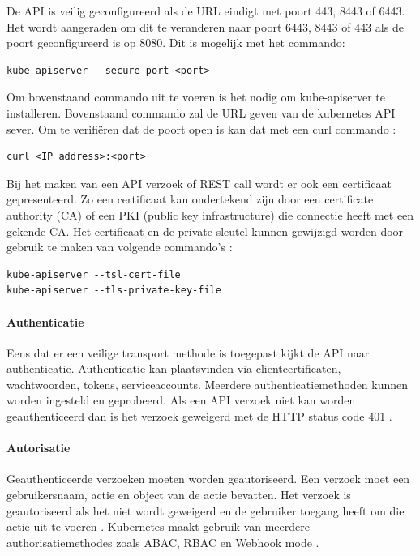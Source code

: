 De API is veilig geconfigureerd als de URL eindigt met poort 443, 8443 of 6443. Het wordt aangeraden om dit te veranderen naar poort 6443, 8443 of 443 als de poort geconfigureerd is op 8080. Dit is mogelijk met het commando:
\begin{lstlisting}[language=tex, caption={Veranderen poort Kubernetes API}]
kube-apiserver --secure-port <port>
\end{lstlisting}

Om bovenstaand commando uit te voeren is het nodig om kube-apiserver te installeren. 
Bovenstaand commando zal de URL geven van de kubernetes API sever. Om te verifiëren dat de poort open is kan dat met een curl commando \autocite{Rice2018}:
\begin{lstlisting}[language=tex, caption={verifiëren poort open}]
curl <IP address>:<port>
\end{lstlisting}

Bij het maken van een API verzoek of REST call wordt er ook een certificaat gepresenteerd. Zo een certificaat kan ondertekend zijn door een certificate authority (CA) of een PKI (public key infrastructure) die connectie heeft met een gekende CA. Het certificaat en de private sleutel kunnen gewijzigd worden door gebruik te maken van volgende commando's \autocite{KubernetesDocs-2023}:
\begin{lstlisting}[language=tex, caption={Wijzigen certificaat en private sleutel}]
kube-apiserver --tsl-cert-file
kube-apiserver --tls-private-key-file
\end{lstlisting}

\paragraph{Authenticatie}
Eens dat er een veilige transport methode is toegepast kijkt de API naar authenticatie. Authenticatie kan plaatsvinden via clientcertificaten, wachtwoorden, tokens, serviceaccounts. Meerdere authenticatiemethoden kunnen worden ingesteld en geprobeerd.
Als een API verzoek niet kan worden geauthenticeerd dan is het verzoek geweigerd met de HTTP status code 401 \autocite{KubernetesDocs-2023}.  

\paragraph{Autorisatie}
Geauthenticeerde verzoeken moeten worden geautoriseerd. Een verzoek moet een gebruikersnaam, actie en object van de actie bevatten. Het verzoek is geautoriseerd als het niet wordt geweigerd en de gebruiker toegang heeft om die actie uit te voeren \autocite{KubernetesDocs-2023}.
Kubernetes maakt gebruik van meerdere authorisatiemethodes zoals ABAC, RBAC en Webhook mode \autocite{KubernetesDocs-2023}. 


